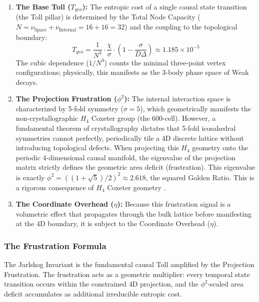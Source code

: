 \begin{enumerate}
    \item \textbf{The Base Toll ($T_{geo}$):} The entropic cost of a single causal state transition (the Toll pillar) is determined by the Total Node Capacity ($N = \nu_{\text{Space}} + \nu_{\text{Internal}} = 16 + 16 = 32$) and the coupling to the topological boundary:
    \begin{equation}
        T_{geo} = \frac{1}{N^3} \cdot \frac{\chi}{\sigma} \cdot \left(1 - \frac{\sigma}{D\Delta}\right) \approx 1.185 \times 10^{-5}
    \end{equation}
    The cubic dependence ($1/N^3$) counts the minimal three-point vertex configurations; physically, this manifests as the 3-body phase space of Weak decays.
    
    \item \textbf{The Projection Frustration ($\phi^2$):} The internal interaction space is characterized by 5-fold symmetry ($\sigma=5$), which geometrically manifests the non-crystallographic $H_4$ Coxeter group (the 600-cell). However, a fundamental theorem of crystallography dictates that 5-fold icosahedral symmetries cannot perfectly, periodically tile a 4D discrete lattice without introducing topological defects. When projecting this $H_4$ geometry onto the periodic 4-dimensional causal manifold, the eigenvalue of the projection matrix strictly defines the geometric area deficit (frustration). This eigenvalue is exactly $\phi^2 = ((1+\sqrt{5})/2)^2 \approx 2.618$, the squared Golden Ratio. This is a rigorous consequence of $H_4$ Coxeter geometry \cite{moody_quasicrystals_1993}.
    
    \item \textbf{The Coordinate Overhead ($\eta$):} Because this frustration signal is a volumetric effect that propagates through the bulk lattice before manifesting at the 4D boundary, it is subject to the Coordinate Overhead ($\eta$).
\end{enumerate}

\subsubsection{The Frustration Formula}
The Jarlskog Invariant is the fundamental causal Toll amplified by the Projection Frustration. The frustration acts as a geometric multiplier: every temporal state transition occurs within the constrained 4D projection, and the $\phi^2$-scaled area deficit accumulates as additional irreducible entropic cost.

